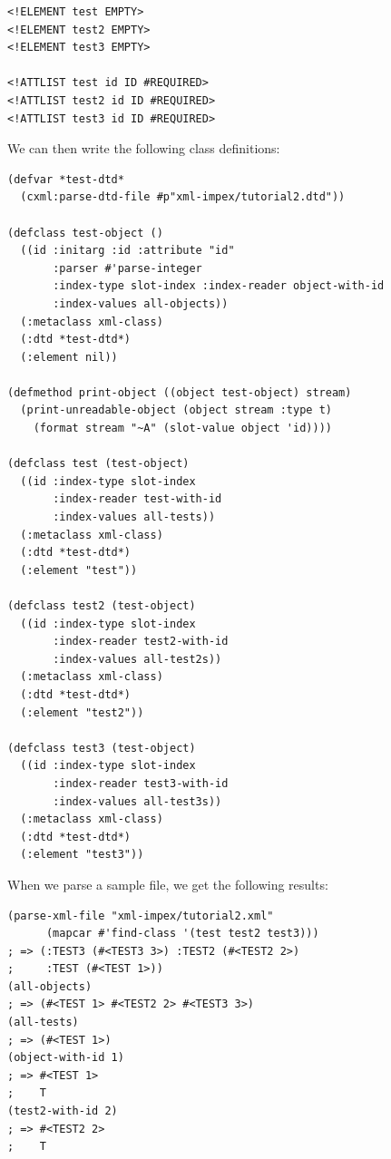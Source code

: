 \begin{Verbatim}[fontsize=\small,frame=leftline,framerule=0.9mm,rulecolor=\color{gray},framesep=5.1mm,xleftmargin=5mm,fontfamily=cmtt]
<!ELEMENT test EMPTY>
<!ELEMENT test2 EMPTY>
<!ELEMENT test3 EMPTY>

<!ATTLIST test id ID #REQUIRED>
<!ATTLIST test2 id ID #REQUIRED>
<!ATTLIST test3 id ID #REQUIRED>
\end{Verbatim}
We can then write the following class definitions:

\begin{Verbatim}[fontsize=\small,frame=leftline,framerule=0.9mm,rulecolor=\color{gray},framesep=5.1mm,xleftmargin=5mm,fontfamily=cmtt]
(defvar *test-dtd*
  (cxml:parse-dtd-file #p"xml-impex/tutorial2.dtd"))

(defclass test-object ()
  ((id :initarg :id :attribute "id"
       :parser #'parse-integer
       :index-type slot-index :index-reader object-with-id
       :index-values all-objects))
  (:metaclass xml-class)
  (:dtd *test-dtd*)
  (:element nil))

(defmethod print-object ((object test-object) stream)
  (print-unreadable-object (object stream :type t)
    (format stream "~A" (slot-value object 'id))))

(defclass test (test-object)
  ((id :index-type slot-index
       :index-reader test-with-id
       :index-values all-tests))
  (:metaclass xml-class)
  (:dtd *test-dtd*)
  (:element "test"))

(defclass test2 (test-object)
  ((id :index-type slot-index
       :index-reader test2-with-id
       :index-values all-test2s))
  (:metaclass xml-class)
  (:dtd *test-dtd*)
  (:element "test2"))

(defclass test3 (test-object)
  ((id :index-type slot-index
       :index-reader test3-with-id
       :index-values all-test3s))
  (:metaclass xml-class)
  (:dtd *test-dtd*)
  (:element "test3"))
\end{Verbatim}
When we parse a sample file, we get the following results:

\begin{Verbatim}[fontsize=\small,frame=leftline,framerule=0.9mm,rulecolor=\color{gray},framesep=5.1mm,xleftmargin=5mm,fontfamily=cmtt]
(parse-xml-file "xml-impex/tutorial2.xml"
      (mapcar #'find-class '(test test2 test3)))
; => (:TEST3 (#<TEST3 3>) :TEST2 (#<TEST2 2>)
;     :TEST (#<TEST 1>))
(all-objects)
; => (#<TEST 1> #<TEST2 2> #<TEST3 3>)
(all-tests)
; => (#<TEST 1>)
(object-with-id 1)
; => #<TEST 1>
;    T
(test2-with-id 2)
; => #<TEST2 2>
;    T
\end{Verbatim}


